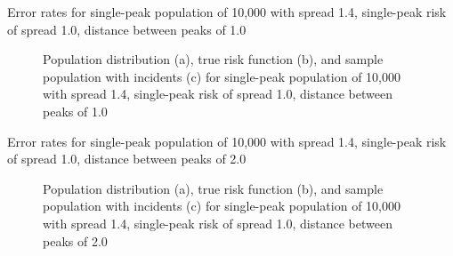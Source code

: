 \graphicspath{{./results/p1.4_100_1_1h_1s/}}
\makeatletter
{}
\makeatother

\begin{table}[H]
    
    \caption[]{Error rates for single-peak population of 10,000 with \gls{spread} 1.4, single-peak risk of \gls{spread} 1.0, distance between peaks of 1.0}
    \label{tab:mean_error_rates:p1.4_100_1_1h_1s}
\end{table}

\begin{figure}[H]
    
    \caption[]{Population distribution (a), true risk function (b), and sample population with incidents (c) for single-peak population of 10,000 with \gls{spread} 1.4, single-peak risk of \gls{spread} 1.0, distance between peaks of 1.0}
    \label{fig:distributions:p1.4_100_1_1h_1s}    
\end{figure}

\graphicspath{{./results/p1.4_100_1_1h_2s/}}
\makeatletter
{}
\makeatother

\begin{table}[H]
    
    \caption[]{Error rates for single-peak population of 10,000 with \gls{spread} 1.4, single-peak risk of \gls{spread} 1.0, distance between peaks of 2.0}
    \label{tab:mean_error_rates:p1.4_100_1_1h_2s}
\end{table}

\begin{figure}[H]
    
    \caption[]{Population distribution (a), true risk function (b), and sample population with incidents (c) for single-peak population of 10,000 with \gls{spread} 1.4, single-peak risk of \gls{spread} 1.0, distance between peaks of 2.0}
    \label{fig:distributions:p1.4_100_1_1h_2s}    
\end{figure}

\graphicspath{{./results/p1.4_100_1_1h_3s/}}
\makeatletter
{}
\makeatother

